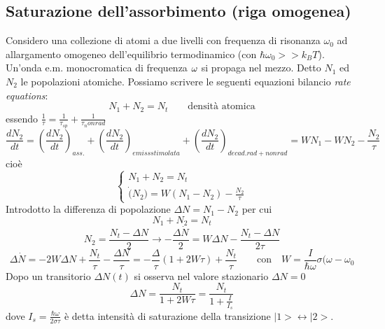 \subsection{Saturazione dell'assorbimento (riga omogenea)}
Considero una collezione di atomi a due livelli con frequenza di risonanza $\omega_0$ ad allargamento omogeneo dell'equilibrio termodinamico (con $\hbar \omega_0 >> k_BT$). Un'onda e.m. monocromatica di frequenza $\omega$ si propaga nel mezzo. Detto $N_1$ ed $N_2$ le popolazioni atomiche. Possiamo scrivere le seguenti equazioni bilancio \textit{rate equations}:
\begin{equation*}
N_1 + N_2 = N_t \qquad \text{densità atomica}
\end{equation*}
essendo $\frac{1}{\tau} = \frac{1}{\tau_{sp}} + \frac{1}{\tau_non rad}$
\begin{equation*}
\frac{dN_2}{dt} = \left( \frac{dN_2}{dt} \right)_{ass.} + \left( \frac{dN_2}{dt} \right)_{emiss stimolata} + \left( \frac{dN_2}{dt} \right)_{decad. rad + non rad} = W N_1 - W N_2 - \frac{N_2}{\tau}
\end{equation*}
cioè
\begin{equation*}
\begin{cases}
N_1 + N_2 = N_t\\
\dot(N_2) = W(N_1 - N_2) - \frac{N_2}{\tau}
\end{cases}
\end{equation*}
Introdotto la differenza di popolazione $\Delta N = N_1 - N_2$ per cui
\begin{equation*}
N_1 + N_2 = N_t
\end{equation*}
\begin{equation*}
N_2 = \frac{N_t - \Delta N}{2} \rightarrow -\frac{\Delta \dot{N}}{2} = W\Delta N - \frac{N_t - \Delta N}{2 \tau}
\end{equation*}
\begin{equation*}
\Delta \dot{N} = -2W \Delta N + \frac{N_t}{\tau} - \frac{\Delta N}{\tau} = - \frac{\Delta}{\tau} (1 + 2W \tau) + \frac{N_t}{\tau} \qquad \text{con} \quad W = \frac{I}{\hbar\omega} \sigma(\omega - \omega_0
\end{equation*}
Dopo un transitorio $\Delta N(t)$ si osserva nel valore stazionario $\Delta N = 0$
\begin{equation*}
\Delta N = \frac{N_t}{1 + 2W\tau} = \frac{N_t}{1 + \frac{I}{I_s}}
\end{equation*}
dove $I_s = \frac{\hbar \omega}{2\sigma \tau}$ è detta intensità di saturazione della transizione $|1> \leftrightarrow |2>$.\\
